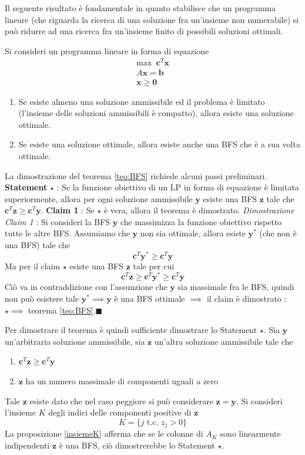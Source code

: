 \documentclass[10pt, letterpaper]{report}
\begin{document}
Il seguente risultato è fondamentale in quanto stabilisce che un programma lineare (che riguarda la ricerca di una soluzione fra un'insieme non numerabile) si può ridurre ad una ricerca fra un'insieme finito di possibili soluzioni ottimali. 
\begin{teorema}\label{teo:BFS}
    Si consideri un programma lineare in forma di equazione
$$ 
\begin{matrix}
    \text{max } \ \mathbf c^T\mathbf x\\ 
    A\mathbf x = \mathbf b\\ 
    \mathbf x \ge  \mathbf 0
\end{matrix}
$$\begin{enumerate}
    \item Se esiste almeno una soluzione ammissibile ed il problema è limitato (l'insieme delle soluzioni ammissibili è compatto), allora esiste una soluzione ottimale.
    \item Se esiste una soluzione ottimale, allora esiste anche una BFS che è a sua volta ottimale.
\end{enumerate}
\end{teorema}
La dimostrazione del teorema \ref{teo:BFS} richiede alcuni passi preliminari. \acc 
\textbf{Statement} $\star$ : Se la funzione obiettivo di un LP in forma di equazione è limitata superiormente, allora per ogni soluzione ammissibile $\mathbf y$ esiste una BFS $\mathbf z$ tale che $\mathbf c^T\mathbf z\ge \mathbf c^T\mathbf y$.\acc 
\textbf{Claim 1} : Se $\star$ è vera, allora il teorema è dimostrato.\acc 
\textit{Dimostrazione Claim 1} : Si consideri la BFS $\mathbf y$ che massimizza la funzione obiettivo rispetto tutte le altre BFS. Assumiamo che $\mathbf y$ non sia ottimale, allora esiste $\mathbf y^*$ (che non è una BFS) tale che 
$$\mathbf c^T\mathbf y^*\ge \mathbf c^T\mathbf y$$
Ma per il claim $\star$ esiste una BFS $\mathbf z$ tale per cui 
$$\mathbf c^T\mathbf z\ge\mathbf c^T\mathbf y^*\ge \mathbf c^T\mathbf y$$
Ciò va in contraddizione con l'assunzione che $\mathbf y$ sia massimale fra le BFS, quindi non può esistere tale $\mathbf y^*\implies \mathbf y$ è una BFS ottimale $\implies$ il claim è dimostrato : $\star \implies $ teorema \ref{teo:BFS}.\hfill$\blacksquare$\bigskip

Per dimostrare il teorema è quindi sufficiente dimostrare lo Statement $\star$.
Sia $\mathbf y$ un'arbitraria soluzione ammissibile, sia $\mathbf z$ un'altra soluzione ammissibile tale che \begin{enumerate}
    \item $\mathbf  c^T\mathbf z\ge \mathbf  c^T\mathbf y$
    \item $\mathbf z$ ha un numero massimale di componenti uguali a zero
\end{enumerate}
Tale $\mathbf z$ esiste dato che nel caso peggiore si può considerare $\mathbf z = \mathbf y$. Si consideri l'insieme $K$ degli indici delle componenti positive di $\mathbf z$ 
$$ K=\{j \text{ t.c. }z_j>0\}$$
La proposizione \ref{insiemeK} afferma che se le colonne di $A_K$ sono linearmente indipendenti $\mathbf z$ è una BFS, ciò dimostrerebbe lo Statement $\star$.
\end{document}
